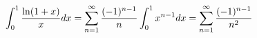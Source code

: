 \documentclass[preview]{standalone}
\begin{document}
\begin{align*}
\special{dvisvgm:raw <g id='unique000'>}\displaystyle\int_0^1\dfrac{\ln(1+x)}{x}dx=\sum_{n=1}^{\infty}\dfrac{(-1)^{n-1}}{n}\int_0^1x^{n-1}dx=\sum_{n=1}^{\infty}\dfrac{(-1)^{n-1}}{n^2}\special{dvisvgm:raw </g>}
\end{align*}
\end{document}
